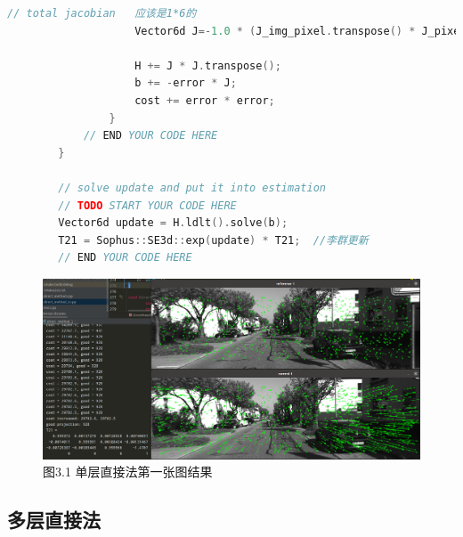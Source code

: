 \documentclass[40pt,a4paper，UTF8]{ctexart}
\numberwithin{equation}{section}
\begin{document}
\begin{lstlisting}[language=C++, caption=单层直接法核心代码]
                    // total jacobian   应该是1*6的
                    Vector6d J=-1.0 * (J_img_pixel.transpose() * J_pixel_xi).transpose();

                    H += J * J.transpose();
                    b += -error * J;
                    cost += error * error;
                }
            // END YOUR CODE HERE
        }

        // solve update and put it into estimation
        // TODO START YOUR CODE HERE
        Vector6d update = H.ldlt().solve(b);
        T21 = Sophus::SE3d::exp(update) * T21;  //李群更新
        // END YOUR CODE HERE
\end{lstlisting}

\begin{figure}[H]
\centering
\includegraphics[width=4.8in]{ch6_3_1.png} {图3.1 单层直接法第一张图结果}
\end{figure}

\subsection{多层直接法}
\end{document}
